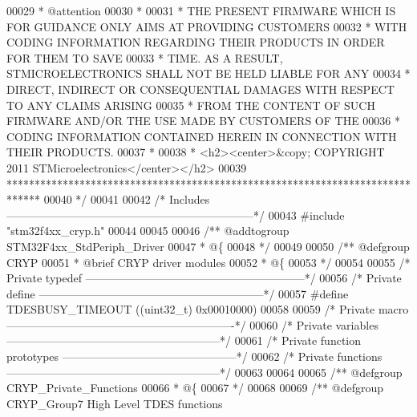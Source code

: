 \begin{DoxyCode}
00029 \textcolor{comment}{  * @attention}
00030 \textcolor{comment}{  *}
00031 \textcolor{comment}{  * THE PRESENT FIRMWARE WHICH IS FOR GUIDANCE ONLY AIMS AT PROVIDING CUSTOMERS}
00032 \textcolor{comment}{  * WITH CODING INFORMATION REGARDING THEIR PRODUCTS IN ORDER FOR THEM TO SAVE}
00033 \textcolor{comment}{  * TIME. AS A RESULT, STMICROELECTRONICS SHALL NOT BE HELD LIABLE FOR ANY}
00034 \textcolor{comment}{  * DIRECT, INDIRECT OR CONSEQUENTIAL DAMAGES WITH RESPECT TO ANY CLAIMS ARISING}
00035 \textcolor{comment}{  * FROM THE CONTENT OF SUCH FIRMWARE AND/OR THE USE MADE BY CUSTOMERS OF THE}
00036 \textcolor{comment}{  * CODING INFORMATION CONTAINED HEREIN IN CONNECTION WITH THEIR PRODUCTS.}
00037 \textcolor{comment}{  *}
00038 \textcolor{comment}{  * <h2><center>&copy; COPYRIGHT 2011 STMicroelectronics</center></h2>}
00039 \textcolor{comment}{  ******************************************************************************}
00040 \textcolor{comment}{  */}
00041 
00042 \textcolor{comment}{/* Includes ------------------------------------------------------------------*/}
00043 \textcolor{preprocessor}{#}\textcolor{preprocessor}{include} "stm32f4xx_cryp.h"
00044 
00045 
00046 \textcolor{comment}{/** @addtogroup STM32F4xx\_StdPeriph\_Driver}
00047 \textcolor{comment}{  * @\{}
00048 \textcolor{comment}{  */}
00049 
00050 \textcolor{comment}{/** @defgroup CRYP }
00051 \textcolor{comment}{  * @brief CRYP driver modules}
00052 \textcolor{comment}{  * @\{}
00053 \textcolor{comment}{  */}
00054 
00055 \textcolor{comment}{/* Private typedef -----------------------------------------------------------*/}
00056 \textcolor{comment}{/* Private define ------------------------------------------------------------*/}
00057 \textcolor{preprocessor}{#}\textcolor{preprocessor}{define} \textcolor{preprocessor}{TDESBUSY\_TIMEOUT}    \textcolor{preprocessor}{(}\textcolor{preprocessor}{(}\textcolor{preprocessor}{uint32\_t}\textcolor{preprocessor}{)} 0x00010000\textcolor{preprocessor}{)}
00058 
00059 \textcolor{comment}{/* Private macro -------------------------------------------------------------*/}
00060 \textcolor{comment}{/* Private variables ---------------------------------------------------------*/}
00061 \textcolor{comment}{/* Private function prototypes -----------------------------------------------*/}
00062 \textcolor{comment}{/* Private functions ---------------------------------------------------------*/}
00063 
00064 
00065 \textcolor{comment}{/** @defgroup CRYP\_Private\_Functions}
00066 \textcolor{comment}{  * @\{}
00067 \textcolor{comment}{  */}
00068 
00069 \textcolor{comment}{/** @defgroup CRYP\_Group7 High Level TDES functions}

\end{DoxyCode}
